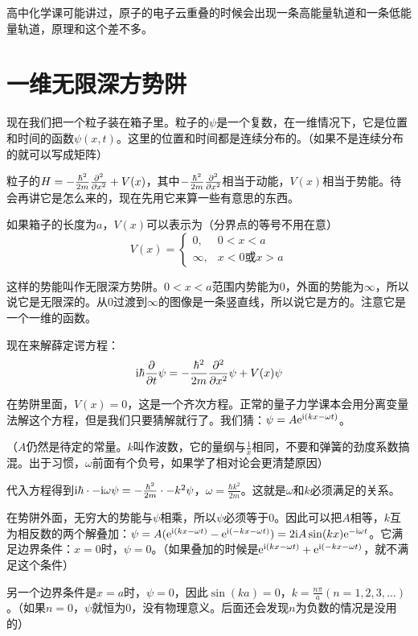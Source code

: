 高中化学课可能讲过，原子的电子云重叠的时候会出现一条高能量轨道和一条低能量轨道，原理和这个差不多。
\section{一维无限深方势阱}
现在我们把一个粒子装在箱子里。粒子的$\psi$是一个复数，在一维情况下，它是位置和时间的函数$\psi(x,t)$。这里的位置和时间都是连续分布的。（如果不是连续分布的就可以写成矩阵）

粒子的$H=-\frac{\hbar^2}{2 m} \frac{\partial^{2}}{\partial x^{2}}+V(x)$，其中$-\frac{\hbar^2}{2 m} \frac{\partial^{2}}{\partial x^{2}}$相当于动能，$V(x)$相当于势能。待会再讲它是怎么来的，现在先用它来算一些有意思的东西。

如果箱子的长度为$a$，$V(x)$可以表示为（分界点的等号不用在意）
\begin{equation*}
V(x)=\begin{cases}
0, &0<x<a \\
\infty, &x<0\text{或}x>a
\end{cases}
\end{equation*}

这样的势能叫作无限深方势阱。$0<x<a$范围内势能为$0$，外面的势能为$\infty$，所以说它是无限深的。从$0$过渡到$\infty$的图像是一条竖直线，所以说它是方的。注意它是一个一维的函数。

现在来解薛定谔方程：
\begin{equation*}
\mathrm{i} \hbar \frac{\partial}{\partial t} \psi=-\frac{\hbar^2}{2 m} \frac{\partial^{2}}{\partial x^{2}} \psi+V(x) \psi
\end{equation*}

在势阱里面，$V(x)=0$，这是一个齐次方程。正常的量子力学课本会用分离变量法解这个方程，但是我们只要猜解就行了。我们猜：$\psi=A \mathrm{e}^{\mathrm{i}(k x-\omega t)}$。

（$A$仍然是待定的常量。$k$叫作波数，它的量纲与$\frac{1}{x}$相同，不要和弹簧的劲度系数搞混。出于习惯，$\omega$前面有个负号，如果学了相对论会更清楚原因）

代入方程得到$\mathrm{i} \hbar \cdot -\mathrm{i} \omega \psi=-\frac{\hbar^2}{2 m} \cdot -k^2 \psi$，$\omega=\frac{\hbar k^2}{2 m}$。这就是$\omega$和$k$必须满足的关系。

在势阱外面，无穷大的势能与$\psi$相乘，所以$\psi$必须等于$0$。因此可以把$A$相等，$k$互为相反数的两个解叠加：$\psi=A (\mathrm{e}^{\mathrm{i}(k x-\omega t)}-\mathrm{e}^{\mathrm{i}(-k x-\omega t)})=2 \mathrm{i} A \sin(k x) \mathrm{e}^{-\mathrm{i} \omega t}$。它满足边界条件：$x=0$时，$\psi=0$。（如果叠加的时候是$\mathrm{e}^{\mathrm{i}(k x-\omega t)}+\mathrm{e}^{\mathrm{i}(-k x-\omega t)}$，就不满足这个条件）

另一个边界条件是$x=a$时，$\psi=0$，因此$\sin(k a)=0$，$k=\frac{n \pi}{a}(n=1,2,3,\dots)$。（如果$n=0$，$\psi$就恒为$0$，没有物理意义。后面还会发现$n$为负数的情况是没用的）

